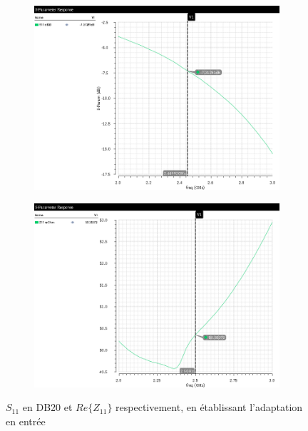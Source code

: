 \documentclass[a4paper]{article}
\begin{document}
\begin{figure}[!htb]
  \begin{subfigure}[t]{.5\linewidth}
      \centering
      \includegraphics[width=1.1\linewidth]{Q2-dB20-adapted.png}
      \label{fig:adaptedDB20}
  \end{subfigure}%
  \begin{subfigure}[t]{.5\linewidth}
    \centering
    \includegraphics[width=1.1\linewidth]{Q2-realZ11-adapted.png}
    \label{fig:adaptedrealZ11}
  \end{subfigure}%
  \caption{$S_{11}$ en DB20 et $Re\{Z_{11}\}$ respectivement, en \'etablissant l'adaptation en entr\'ee}
  \label{fig:adaptedrealZ11-DB20}
\end{figure}
\end{document}
